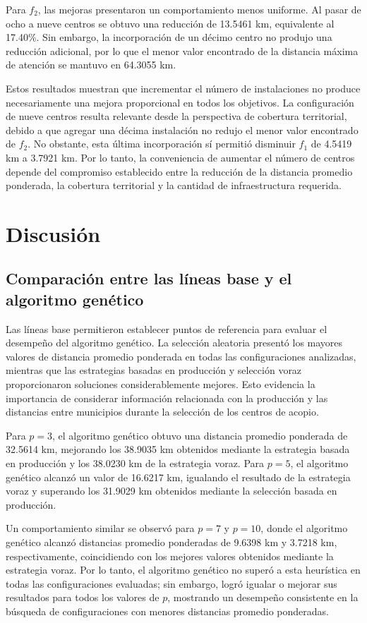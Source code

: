 \documentclass[journal]{IEEEtran}
\begin{document}
Para $f_2$, las mejoras presentaron un comportamiento menos uniforme. Al pasar de ocho a nueve centros se obtuvo una reducción de 13.5461 km, equivalente al 17.40\%. Sin embargo, la incorporación de un décimo centro no produjo una reducción adicional, por lo que el menor valor encontrado de la distancia máxima de atención se mantuvo en 64.3055 km.

Estos resultados muestran que incrementar el número de instalaciones no produce necesariamente una mejora proporcional en todos los objetivos. La configuración de nueve centros resulta relevante desde la perspectiva de cobertura territorial, debido a que agregar una décima instalación no redujo el menor valor encontrado de $f_2$. No obstante, esta última incorporación sí permitió disminuir $f_1$ de 4.5419 km a 3.7921 km. Por lo tanto, la conveniencia de aumentar el número de centros depende del compromiso establecido entre la reducción de la distancia promedio ponderada, la cobertura territorial y la cantidad de infraestructura requerida.

\section{Discusión}

\subsection{Comparación entre las líneas base y el algoritmo genético}

Las líneas base permitieron establecer puntos de referencia para evaluar el desempeño del algoritmo genético. La selección aleatoria presentó los mayores valores de distancia promedio ponderada en todas las configuraciones analizadas, mientras que las estrategias basadas en producción y selección voraz proporcionaron soluciones considerablemente mejores. Esto evidencia la importancia de considerar información relacionada con la producción y las distancias entre municipios durante la selección de los centros de acopio.

Para $p=3$, el algoritmo genético obtuvo una distancia promedio ponderada de 32.5614 km, mejorando los 38.9035 km obtenidos mediante la estrategia basada en producción y los 38.0230 km de la estrategia voraz. Para $p=5$, el algoritmo genético alcanzó un valor de 16.6217 km, igualando el resultado de la estrategia voraz y superando los 31.9029 km obtenidos mediante la selección basada en producción.

Un comportamiento similar se observó para $p=7$ y $p=10$, donde el algoritmo genético alcanzó distancias promedio ponderadas de 9.6398 km y 3.7218 km, respectivamente, coincidiendo con los mejores valores obtenidos mediante la estrategia voraz. Por lo tanto, el algoritmo genético no superó a esta heurística en todas las configuraciones evaluadas; sin embargo, logró igualar o mejorar sus resultados para todos los valores de $p$, mostrando un desempeño consistente en la búsqueda de configuraciones con menores distancias promedio ponderadas.
\end{document}
